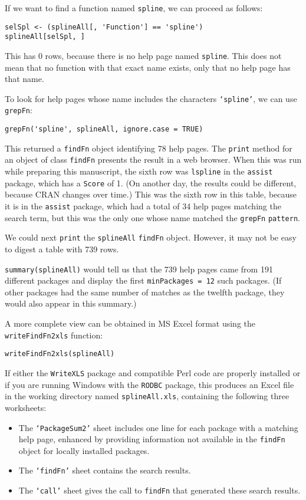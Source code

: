 If we want to find a function named {\tt spline}, we can
proceed as follows:
\begin{verbatim}
selSpl <- (splineAll[, 'Function'] == 'spline')
splineAll[selSpl, ]
\end{verbatim}
This has 0 rows, because there is no help page named
{\tt spline}.  This does not mean that no function
with that exact name exists, only that no help page
has that name.

To look for help pages whose name includes the characters
{\tt `spline'}, we can use {\tt grepFn}:
\begin{verbatim}
grepFn('spline', splineAll, ignore.case = TRUE)
\end{verbatim}
This returned a {\tt findFn} object identifying 78 help pages.
The {\tt print} method for an object of class {\tt findFn}
presents the result in a web browser.  When this was
run while preparing this manuscript, the sixth row was
{\tt lspline} in the
{\tt assist} package, which has a {\tt Score} of 1.
(On another day, the results could be different, because
CRAN changes over time.)  This was the sixth row in this
table, because it is in the
{\tt assist} package, which had a total of 34 help
pages matching the search term, but this was the only
one whose name matched the {\tt grepFn} {\tt pattern}.

We could next {\tt print} the {\tt splineAll} {\tt findFn}
object.  However, it may not be easy to digest a table
with 739 rows.

{\tt summary(splineAll)} would tell us that the 739 help pages
came from 191 different packages and display the first
{\tt minPackages = 12} such packages.
(If other packages had the same number of
matches as the twelfth package, they would also appear in this
summary.)

A more complete view can be obtained in MS Excel format
using the {\tt writeFindFn2xls} function:
\begin{verbatim}
writeFindFn2xls(splineAll)
\end{verbatim}
If either the {\tt WriteXLS} package and compatible Perl code
are properly installed or if you are running Windows with
the {\tt RODBC} package, this produces an Excel file in the
working directory named {\tt splineAll.xls}, containing the
following three worksheets:

\begin{itemize}
\item{The {\tt `PackageSum2'} sheet includes one line for each
package with a matching help page, enhanced by providing
information not available in the {\tt findFn} object
for locally installed packages.}
\item{The {\tt `findFn'} sheet contains the search results.}
\item{The {\tt `call'} sheet gives the call to {\tt findFn}
that generated these search results.}
\end{itemize}

